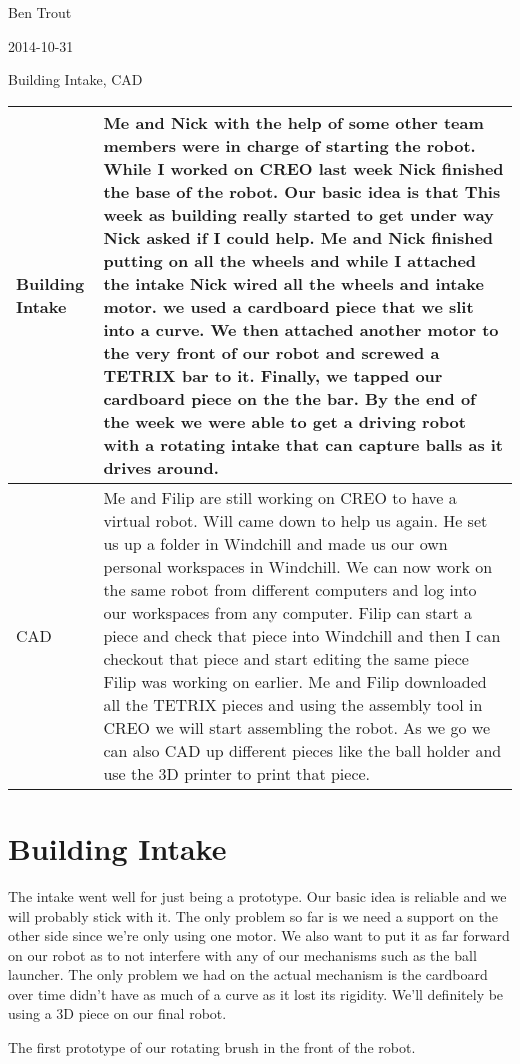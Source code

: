 Ben Trout

2014-10-31

Building Intake, CAD

\begin{tabular}{|p{5cm}|p{5cm}|}
\hline
 Building Intake&
Me and Nick with the help of some other team members were in charge of starting the robot. While I worked on CREO last week Nick finished the base of the robot. Our basic idea is  that This week as building really started to get under way Nick asked if I could help. Me and Nick finished putting on all the wheels and while I attached the intake Nick wired all the wheels and intake motor. we used a cardboard piece that we slit into a curve. We then attached another motor to the very front of our robot and screwed a TETRIX bar to it. Finally, we tapped our cardboard piece on the the bar. By the end of the week we were able to get a driving robot with a rotating intake that can capture balls as it drives around. 
\\
\hline
 CAD&
Me and Filip are still working on CREO to have a virtual robot. Will came down to help us again. He set us up a folder in Windchill and made us our own personal workspaces in Windchill. We can now work on the same robot from different computers and log into our workspaces from any computer. Filip can start a piece and check that piece into Windchill and then I can checkout that piece and start editing the same piece Filip was working on earlier. Me and Filip downloaded all the TETRIX pieces and using the assembly tool in CREO we will start assembling the robot. As we go we can also CAD up different pieces like the ball holder and use the 3D printer to print that piece. 
\\
\hline
\end{tabular}

\section*{Building Intake}
The intake went well for just being a prototype. Our basic idea is reliable and we will probably stick with it. The only problem so far is we need a support on the other side since we’re only using one motor. We also want to put it as far forward on our robot as to not interfere with any of our mechanisms such as the ball launcher. The only problem we had on the actual mechanism is the cardboard over time didn’t have as much of a curve as it lost its rigidity. We’ll definitely be using a 3D piece on our final robot. 


\begin{center}
\end{center}

The first prototype of our rotating brush in the front of the robot. 